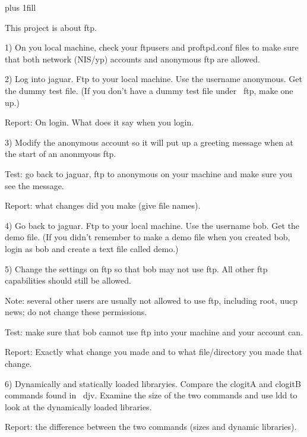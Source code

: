 
\rightskip=0pt plus 1fill

\parindent 0pt

This project is about ftp.

1) On you local machine, check your {\ltt{}ftpusers}
and {\ltt{}proftpd.conf} files to make sure that
both network (NIS/yp) accounts and anonymous ftp
are allowed.

2) Log into jaguar.
Ftp to your local machine.
Use the username anonymous.
Get the dummy test file.
(If you don't have a dummy test file under {\ltt{}~ftp}, make one up.)

Report: On login. What does it say when you login.


3) Modify the anonymous account so it
will put up a greeting message when at the start of
an anonmyous ftp.

Test: go back to jaguar, ftp to anonymous on your machine
and make sure you see the message.

Report: what changes did you make (give file names).

4) Go back to jaguar.
Ftp to your local machine.
Use the username bob.
Get the {\ltt{}demo} file.
(If you didn't remember to make a demo file when you created
bob, login as bob and create a text file called demo.)

5) Change the settings on ftp so that {\ltt{}bob} may not use ftp.
All other ftp capabilities should still be allowed.

Note: several other users are usually not allowed to use ftp, including {\ltt{}root}, {\ltt{}uucp}
{\ltt{}news}; do not change these permissions.

Test: make sure that {\ltt{}bob} cannot use ftp into your machine and your
account can.

Report: Exactly what change you made and to what
file/directory you made that change.

6) Dynamically and statically loaded libraryies.
Compare the {\ltt{}clogitA} and {\ltt{}clogitB} commands found in {\ltt{}~djv}.
Examine the size of the two commands
and use {\ltt{}ldd} to look at the dynamically loaded libraries.

Report: the difference between the two commands (sizes and dynamic libraries).
\bye
